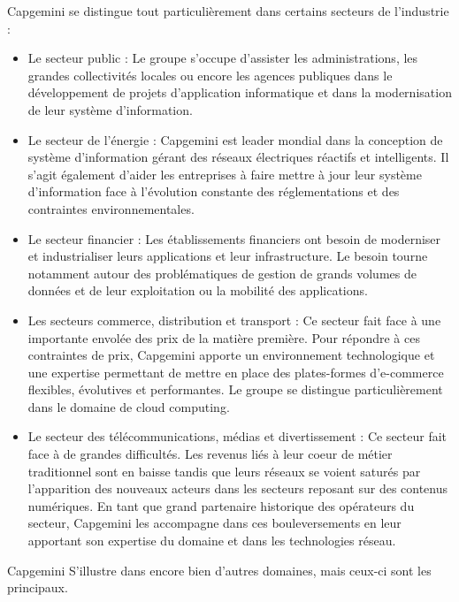 Capgemini se distingue tout particulièrement dans certains secteurs de l'industrie :

\begin{itemize}
    \item Le secteur public : Le groupe s'occupe d'assister les administrations, les grandes collectivités locales ou encore les agences publiques dans le développement de projets d'application informatique et dans la modernisation de leur système d'information.
    \item Le secteur de l'énergie : Capgemini est leader mondial dans la conception de système d'information gérant des réseaux électriques réactifs et intelligents. Il s'agit également d'aider les entreprises à faire mettre à jour leur système d'information face à l'évolution constante des réglementations et des contraintes environnementales.
    \item Le secteur financier : Les établissements financiers ont besoin de moderniser et industrialiser leurs applications et leur infrastructure. Le besoin tourne notamment autour des problématiques de gestion de grands volumes de données et de leur exploitation ou la mobilité des applications.
    \item Les secteurs commerce, distribution et transport : Ce secteur fait face à une importante envolée des prix de la matière première. Pour répondre à ces contraintes de prix, Capgemini apporte un environnement technologique et une expertise permettant de mettre en place des plates-formes d'e-commerce flexibles, évolutives et performantes. Le groupe se distingue particulièrement dans le domaine de cloud computing.
    \item Le secteur des télécommunications, médias et divertissement : Ce secteur fait face à de grandes difficultés. Les revenus liés à leur coeur de métier traditionnel sont en baisse tandis que leurs réseaux se voient saturés par l'apparition des nouveaux acteurs dans les secteurs reposant sur des contenus numériques. En tant que grand partenaire historique des opérateurs du secteur, Capgemini les accompagne dans ces bouleversements en leur apportant son expertise du domaine et dans les technologies réseau.
\end{itemize}

Capgemini S'illustre dans encore bien d'autres domaines, mais ceux-ci sont les principaux.
